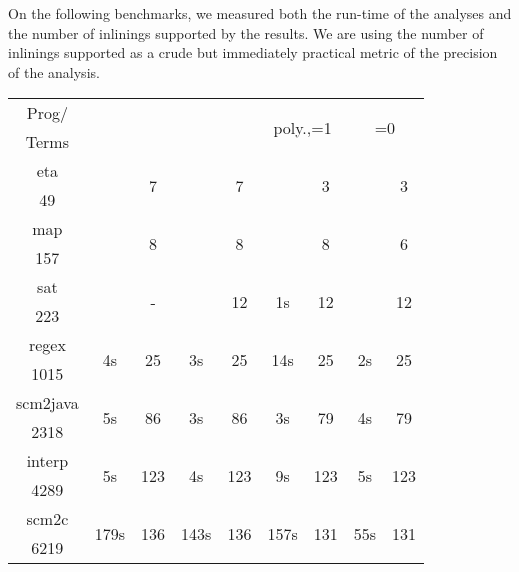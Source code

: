 On the following benchmarks, we measured both the run-time of the
analyses and the number of inlinings supported by the results.
We are using the number of inlinings supported as a crude but
immediately practical metric of the precision of the analysis.
\begin{center}
{
\small
\begin{tabular}{|c|cc|cc|cc|cc|}
\hline
\textsf{Prog}/&
  \multicolumn{2}{|c|}{\multirow{2}{*}{\textsf{}}} & 
  \multicolumn{2}{|c|}{\multirow{2}{*}{\textsf{}}} &
  \multicolumn{2}{|c|}{\multirow{2}{*}{\textsf{poly.,=1}}} &
  \multicolumn{2}{|c|}{\multirow{2}{*}{\textsf{=0}}} \\
\textsf{Terms} & & & & & & & &
\\
\hline
\hline
\textsf{eta}
  & \multirow{2}{*}{} & \multirow{2}{*}{7} 
  & \multirow{2}{*}{} & \multirow{2}{*}{7}
  & \multirow{2}{*}{} & \multirow{2}{*}{3}
  & \multirow{2}{*}{} & \multirow{2}{*}{3}
\\
\textsf{49} & & & & & & & & \\
\hline
\textsf{map}
  & \multirow{2}{*}{} & \multirow{2}{*}{8}
  & \multirow{2}{*}{} & \multirow{2}{*}{8}
  & \multirow{2}{*}{} & \multirow{2}{*}{8}
  & \multirow{2}{*}{} & \multirow{2}{*}{6}
\\
\textsf{157} & & & & & & & & \\
\hline
\textsf{sat}
  & \multirow{2}{*}{}   & \multirow{2}{*}{-}
  & \multirow{2}{*}{} &  \multirow{2}{*}{12} 
  & \multirow{2}{*}{1s}         &  \multirow{2}{*}{12}  
  & \multirow{2}{*}{} & \multirow{2}{*}{12} 
\\
\textsf{223} & & & & & & & & \\
\hline
\textsf{regex}
  & \multirow{2}{*}{4s}  &  \multirow{2}{*}{25}
  & \multirow{2}{*}{3s}  &  \multirow{2}{*}{25}
  & \multirow{2}{*}{14s} &  \multirow{2}{*}{25}
  & \multirow{2}{*}{2s}  &  \multirow{2}{*}{25} 
\\
\textsf{1015} & & & & & & & & \\
\hline
\textsf{scm2java}
  & \multirow{2}{*}{5s} &  \multirow{2}{*}{86}
  & \multirow{2}{*}{3s} &  \multirow{2}{*}{86} 
  & \multirow{2}{*}{3s} &  \multirow{2}{*}{79}
  & \multirow{2}{*}{4s} &  \multirow{2}{*}{79}
\\
\textsf{2318} & & & & & & & & \\
\hline
\textsf{interp}
  & \multirow{2}{*}{5s} &  \multirow{2}{*}{123}
  & \multirow{2}{*}{4s} &  \multirow{2}{*}{123}
  & \multirow{2}{*}{9s} &  \multirow{2}{*}{123}
  & \multirow{2}{*}{5s} &  \multirow{2}{*}{123}
\\
\textsf{4289} & & & & & & & & \\
\hline
\textsf{scm2c}
  & \multirow{2}{*}{179s} &  \multirow{2}{*}{136}
  & \multirow{2}{*}{143s} &  \multirow{2}{*}{136}
  & \multirow{2}{*}{157s} &  \multirow{2}{*}{131}
  & \multirow{2}{*}{55s} &  \multirow{2}{*}{131}
\\
\textsf{6219} & & & & & & & & \\
\hline
\end{tabular}
}
\end{center}
